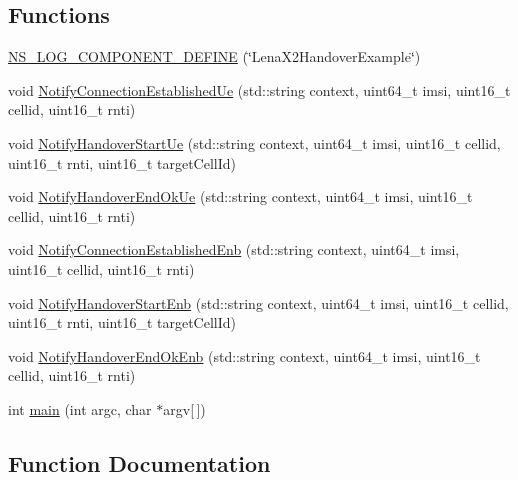 \subsection*{Functions}
\begin{DoxyCompactItemize}
\item 
\hyperlink{lena-x2-handover_8cc_a288ceedc37d4c3a1bb3b79f471f64441}{N\+S\+\_\+\+L\+O\+G\+\_\+\+C\+O\+M\+P\+O\+N\+E\+N\+T\+\_\+\+D\+E\+F\+I\+NE} (\char`\"{}Lena\+X2\+Handover\+Example\char`\"{})
\item 
void \hyperlink{lena-x2-handover_8cc_a7b068dcdfdae75954b1d6a533108413e}{Notify\+Connection\+Established\+Ue} (std\+::string context, uint64\+\_\+t imsi, uint16\+\_\+t cellid, uint16\+\_\+t rnti)
\item 
void \hyperlink{lena-x2-handover_8cc_a86f5a4f1ce25b40b625682a16b714f03}{Notify\+Handover\+Start\+Ue} (std\+::string context, uint64\+\_\+t imsi, uint16\+\_\+t cellid, uint16\+\_\+t rnti, uint16\+\_\+t target\+Cell\+Id)
\item 
void \hyperlink{lena-x2-handover_8cc_a62f1fe4dd47681ddfbff0249874e5653}{Notify\+Handover\+End\+Ok\+Ue} (std\+::string context, uint64\+\_\+t imsi, uint16\+\_\+t cellid, uint16\+\_\+t rnti)
\item 
void \hyperlink{lena-x2-handover_8cc_a9ebcea277a72efa6dbfd310068addf75}{Notify\+Connection\+Established\+Enb} (std\+::string context, uint64\+\_\+t imsi, uint16\+\_\+t cellid, uint16\+\_\+t rnti)
\item 
void \hyperlink{lena-x2-handover_8cc_a98a48f4218409f1681fc99d3d070d8ee}{Notify\+Handover\+Start\+Enb} (std\+::string context, uint64\+\_\+t imsi, uint16\+\_\+t cellid, uint16\+\_\+t rnti, uint16\+\_\+t target\+Cell\+Id)
\item 
void \hyperlink{lena-x2-handover_8cc_aef8eb0154877f4690ac5062d7875d5f1}{Notify\+Handover\+End\+Ok\+Enb} (std\+::string context, uint64\+\_\+t imsi, uint16\+\_\+t cellid, uint16\+\_\+t rnti)
\item 
int \hyperlink{lena-x2-handover_8cc_a0ddf1224851353fc92bfbff6f499fa97}{main} (int argc, char $\ast$argv\mbox{[}$\,$\mbox{]})
\end{DoxyCompactItemize}


\subsection{Function Documentation}
